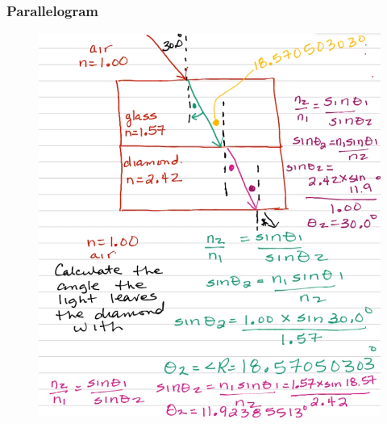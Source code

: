 \documentclass[a4paper,12pt]{article}
\begin{document}
\subsubsection{Parallelogram}
\begin{figure}[H]
    \centering
    \includegraphics[width=\textwidth]{ex-sqr}
\end{figure}
\end{document}
